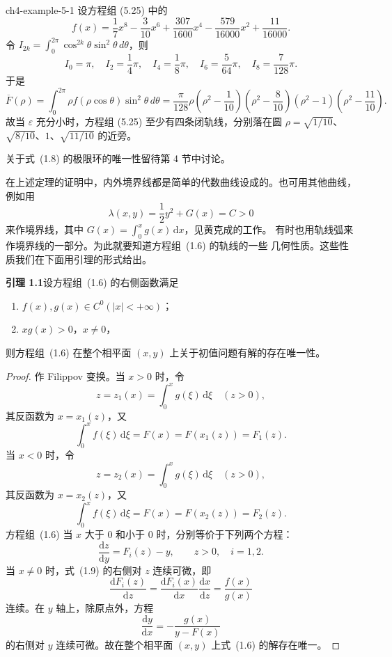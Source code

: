 \begin{example}{ }{ch4-example-5-1}
设方程组 (5.25) 中的
\[
f(x)=\dfrac17x^8-\dfrac3{10}x^6+\dfrac{307}{1600}x^4-\dfrac{579}{16000}x^2+\dfrac{11}{16000}.
\]
令 $I_{2k}=\int_0^{2\pi}\cos^{2k}\theta\sin^2\theta\,d\theta$，则
\[
I_0=\pi,\quad I_2=\dfrac14\pi,\quad I_4=\dfrac18\pi,\quad I_6=\dfrac5{64}\pi,\quad I_8=\dfrac7{128}\pi.
\]
于是
\[
\overline F(\rho)=\int_0^{2\pi}\rho f(\rho\cos\theta)\sin^2\theta\,d\theta
=\dfrac\pi{128}\rho\left(\rho^2-\dfrac1{10}\right)\left(\rho^2-\dfrac8{10}\right)(\rho^2-1)\left(\rho^2-\dfrac{11}{10}\right).
\]
故当 $\varepsilon$ 充分小时，方程组 (5.25) 至少有四条闭轨线，分别落在圆 $\rho=\sqrt{1/10}$、$\sqrt{8/10}$、$1$、$\sqrt{11/10}$ 的近旁。
\end{example}

\fi

关于式~(1.8) 的极限环的唯一性留待第 4 节中讨论。

在上述定理的证明中，内外境界线都是简单的代数曲线设成的。也可用其他曲线，
例如用
\[
  \lambda(x,y)=\dfrac12y^2+G(x)=C>0
\]
来作境界线，其中 $G(x)=\int_0^xg(x)\,\mathrm{d}x$，见黄克成的工作\cite{9}。
有时也用轨线弧来作境界线的一部分。为此就要知道方程组~(1.6) 的轨线的一些
几何性质。这些性质我们在下面用引理的形式给出。

\noindent\textbf{引理 1.1}\quad 设方程组~(1.6) 的右侧函数满足
\begin{enumerate}
  \item $f(x),g(x)\in C^0(|x|<+\infty)$；
  \item $xg(x)>0$，$x\ne0$，
\end{enumerate}
则方程组~(1.6) 在整个相平面 $(x,y)$ 上关于初值问题有解的存在唯一性。

\begin{proof}
作 Filippov 变换。当 $x>0$ 时，令
\[
  z=z_1(x)=\int_0^xg(\xi)\,\mathrm{d}\xi\quad(z>0),
\]
其反函数为 $x=x_1(z)$，又
\[
  \int_0^xf(\xi)\,\mathrm{d}\xi=F(x)=F(x_1(z))=F_1(z).
\]
当 $x<0$ 时，令
\[
  z=z_2(x)=\int_0^xg(\xi)\,\mathrm{d}\xi\quad(z>0),
\]
其反函数为 $x=x_2(z)$，又
\[
  \int_0^xf(\xi)\,\mathrm{d}\xi=F(x)=F(x_2(z))=F_2(z).
\]
方程组~(1.6) 当 $x$ 大于 $0$ 和小于 $0$ 时，分别等价于下列两个方程：
\[
  \dfrac{\mathrm{d}z}{\mathrm{d}y}=F_i(z)-y,\qquad z>0,\quad i=1,2. \tag{1.9}
\]
当 $x\ne0$ 时，式~(1.9) 的右侧对 $z$ 连续可微，即
\[
  \dfrac{\mathrm{d}F_i(z)}{\mathrm{d}z}
  =\dfrac{\mathrm{d}F_i(x)}{\mathrm{d}x}\dfrac{\mathrm{d}x}{\mathrm{d}z}
  =\dfrac{f(x)}{g(x)}
\]
连续。在 $y$ 轴上，除原点外，方程
\[
  \dfrac{\mathrm{d}y}{\mathrm{d}x}=-\dfrac{g(x)}{y-F(x)}
\]
的右侧对 $y$ 连续可微。故在整个相平面 $(x,y)$ 上式~(1.6) 的解存在唯一。
\end{proof}

